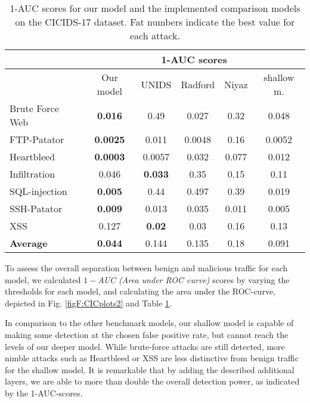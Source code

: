 \begin{table}[ht]
\centering
\begin{tabular}{l|c|ccc|c}
\multicolumn{1}{c|}{ }&\multicolumn{5}{c}{1-AUC scores}\\

  \hline
  & Our model&UNIDS&Radford&Niyaz&shallow m.\\ 
  \hline
Brute Force Web & \textbf{0.016}&0.49&0.027&0.32 &0.048 \\ 
  FTP-Patator & \textbf{0.0025}&0.011&0.0048&0.16 &0.0052\\ 
  Heartbleed  & \textbf{0.0003}&0.0057&0.032&0.077 &0.012\\ 
  Infiltration &0.046& \textbf{0.033}&0.35&0.15&0.11\\ 
  SQL-injection & \textbf{0.005}&0.44&0.497&0.39&0.019\\ 
  SSH-Patator & \textbf{0.009}&0.013&0.035&0.011&0.005\\ 
  XSS &0.127&\textbf{0.02}&0.03&0.16&0.13\\ 
   \hline
\textbf{Average}&\textbf{0.044} & 0.144&0.135&0.18 &0.091 \\
\end{tabular}
\vspace{2pt}
\caption{1-AUC scores for our model and the implemented comparison models on the CICIDS-17 dataset. Fat numbers indicate the best value for each attack.}%
\label{tabF:dfCICAUC}
\end{table}

To assess the overall separation between benign and malicious traffic for each model, we calculated $1-$\emph{AUC (Area under ROC curve)} scores by varying the thresholds for each model, and calculating the area under the ROC-curve, depicted in Fig. \ref{figF:CICplots2} and Table \ref{tabF:dfCICAUC}. 

In comparison to the other benchmark models, our shallow model is capable of making some detection at the chosen false positive rate, but cannot reach the levels of our deeper model.  While brute-force attacks are still detected, more nimble attacks such as Heartbleed or XSS are less distinctive from benign traffic for the shallow model.
It is remarkable that by adding the described additional layers, we are able to more than double the overall detection power, as indicated by the 1-AUC-scores.


